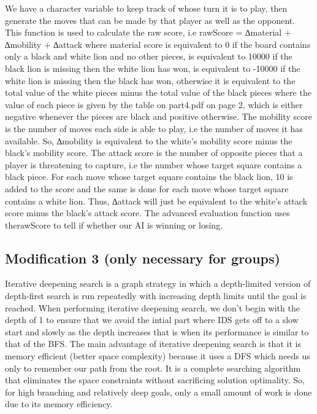 \documentclass[twocolumn]{article}
\begin{document}
We have a character variable to keep track of whose turn it is to play, then generate the moves that can be made by that player as well as the opponent. This function is used to calculate the raw score, i.e rawScore = ∆material + ∆mobility + ∆attack where material score is equivalent to 0 if the board contains only a black and white lion and no other pieces, is equivalent to 10000 if the black lion is missing then the white lion has won, is equivalent to -10000 if the white lion is missing then the black has won, otherwise it is equivalent to the total value of the white pieces minus the total value of the black pieces where the value of each piece is given by the table on part4.pdf on page 2, which is either negative whenever the pieces are black and positive otherwise. The mobility score is the number of moves each side is able to play, i.e the number of moves it has available. So, ∆mobility is equivalent to the white's mobility score minus the black's mobility score. The attack score is the number of opposite pieces that a player is threatening to capture, i.e the number whose target square contains a black piece. For each move whose target square  contains the black lion, 10 is added to the score and the same is done for each move whose target square contains a white lion. Thus, ∆attack will just be equivalent to the white's attack score minus the black's attack score.  The advanced evaluation function uses therawScore to tell if whether our AI is winning or losing.

\subsection{Modification 3 (only necessary for groups)}

Iterative deepening search is a graph strategy in which a depth-limited version of depth-first search is run repeatedly with increasing depth limits until the goal is reached. When performing iterative deepening search, we don't begin with the depth of 1 to ensure that we avoid the intial part where IDS gets off to a slow start and slowly as the depth increases that is when its performance is similar to that of the BFS. The main advantage of iterative deepening search is that it is memory efficient (better space complexity) because it uses a DFS which needs us only to remember our path from the root. It is a complete searching algorithm that eliminates the space constraints without sacrificing solution optimality. So, for high branching and relatively deep goals, only a small amount of work is done due to its memory efficiency.
\end{document}
